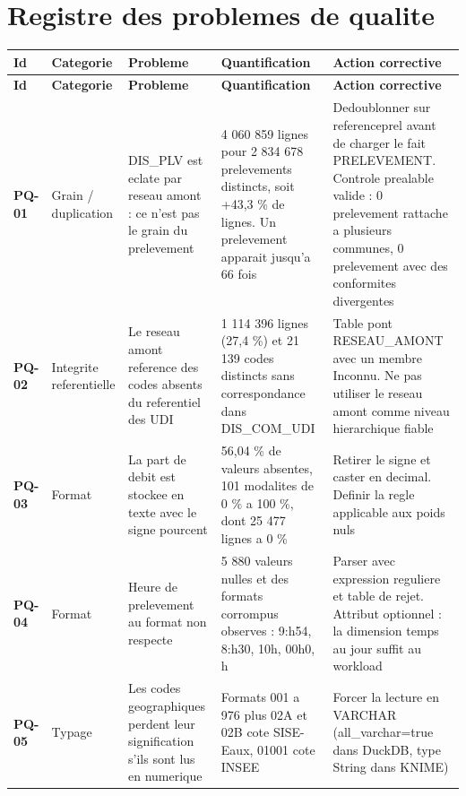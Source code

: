 \section{Registre des problemes de qualite}

{\footnotesize\setlength{\tabcolsep}{3pt}
\begin{longtable}{@{}p{1.1cm}p{2.2cm}p{4.2cm}p{3.6cm}p{4.3cm}@{}}
\toprule
\textbf{Id} & \textbf{Categorie} & \textbf{Probleme} & \textbf{Quantification} & \textbf{Action corrective} \\
\midrule \endfirsthead
\toprule \textbf{Id} & \textbf{Categorie} & \textbf{Probleme} & \textbf{Quantification} & \textbf{Action corrective} \\ \midrule \endhead
\bottomrule \endfoot
\textbf{PQ-01} & Grain / duplication & DIS\_PLV est eclate par reseau amont : ce n'est pas le grain du prelevement & 4 060 859 lignes pour 2 834 678 prelevements distincts, soit +43,3 \% de lignes. Un prelevement apparait jusqu'a 66 fois & Dedoublonner sur referenceprel avant de charger le fait PRELEVEMENT. Controle prealable valide : 0 prelevement rattache a plusieurs communes, 0 prelevement avec des conformites divergentes \\[2pt]
\textbf{PQ-02} & Integrite referentielle & Le reseau amont reference des codes absents du referentiel des UDI & 1 114 396 lignes (27,4 \%) et 21 139 codes distincts sans correspondance dans DIS\_COM\_UDI & Table pont RESEAU\_AMONT avec un membre Inconnu. Ne pas utiliser le reseau amont comme niveau hierarchique fiable \\[2pt]
\textbf{PQ-03} & Format & La part de debit est stockee en texte avec le signe pourcent & 56,04 \% de valeurs absentes, 101 modalites de 0 \% a 100 \%, dont 25 477 lignes a 0 \% & Retirer le signe et caster en decimal. Definir la regle applicable aux poids nuls \\[2pt]
\textbf{PQ-04} & Format & Heure de prelevement au format non respecte & 5 880 valeurs nulles et des formats corrompus observes : 9:h54, 8:h30, 10h, 00h0, h & Parser avec expression reguliere et table de rejet. Attribut optionnel : la dimension temps au jour suffit au workload \\[2pt]
\textbf{PQ-05} & Typage & Les codes geographiques perdent leur signification s'ils sont lus en numerique & Formats 001 a 976 plus 02A et 02B cote SISE-Eaux, 01001 cote INSEE & Forcer la lecture en VARCHAR (all\_varchar=true dans DuckDB, type String dans KNIME) \\[2pt]

\end{longtable}}
